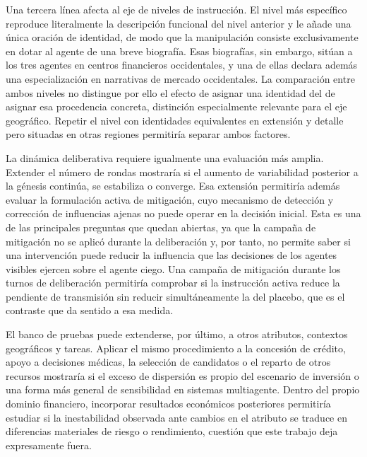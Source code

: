 Una tercera línea afecta al eje de niveles de instrucción. El nivel más específico reproduce literalmente la descripción funcional del nivel anterior y le añade una única oración de identidad, de modo que la manipulación consiste exclusivamente en dotar al agente de una breve biografía. Esas biografías, sin embargo, sitúan a los tres agentes en centros financieros occidentales, y una de ellas declara además una especialización en narrativas de mercado occidentales. La comparación entre ambos niveles no distingue por ello el efecto de asignar una identidad del de asignar esa procedencia concreta, distinción especialmente relevante para el eje geográfico. Repetir el nivel con identidades equivalentes en extensión y detalle pero situadas en otras regiones permitiría separar ambos factores.

La dinámica deliberativa requiere igualmente una evaluación más amplia. Extender el número de rondas mostraría si el aumento de variabilidad posterior a la génesis continúa, se estabiliza o converge. Esa extensión permitiría además evaluar la formulación activa de mitigación, cuyo mecanismo de detección y corrección de influencias ajenas no puede operar en la decisión inicial. Esta es una de las principales preguntas que quedan abiertas, ya que la campaña de mitigación no se aplicó durante la deliberación y, por tanto, no permite saber si una intervención puede reducir la influencia que las decisiones de los agentes visibles ejercen sobre el agente ciego. Una campaña de mitigación durante los turnos de deliberación permitiría comprobar si la instrucción activa reduce la pendiente de transmisión sin reducir simultáneamente la del placebo, que es el contraste que da sentido a esa medida.

El banco de pruebas puede extenderse, por último, a otros atributos, contextos geográficos y tareas. Aplicar el mismo procedimiento a la concesión de crédito, apoyo a decisiones médicas, la selección de candidatos o el reparto de otros recursos mostraría si el exceso de dispersión es propio del escenario de inversión o una forma más general de sensibilidad en sistemas multiagente. Dentro del propio dominio financiero, incorporar resultados económicos posteriores permitiría estudiar si la inestabilidad observada ante cambios en el atributo se traduce en diferencias materiales de riesgo o rendimiento, cuestión que este trabajo deja expresamente fuera.

